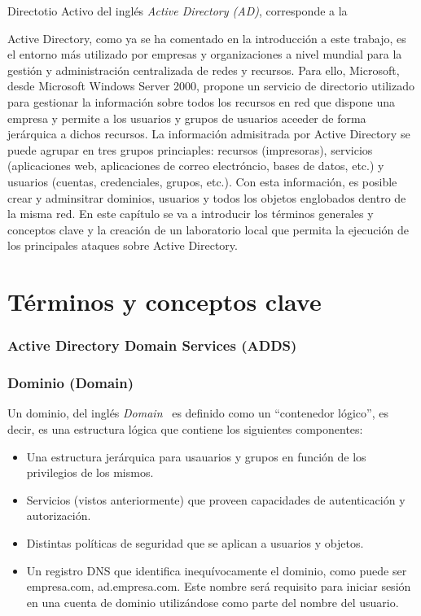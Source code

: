 Directotio Activo del inglés {\it Active Directory (AD)}, corresponde a la 

Active Directory, como ya se ha comentado en la introducción a este trabajo, es el entorno más utilizado por empresas y organizaciones a nivel mundial para la gestión y administración centralizada de redes y recursos. Para ello, Microsoft, desde Microsoft Windows Server 2000, propone un servicio de directorio utilizado para gestionar la in\-for\-ma\-ción sobre todos los recursos en red que dispone una empresa y permite a los usuarios y grupos de usuarios aceeder de forma jerárquica a dichos recursos. La in\-for\-ma\-ción admisitrada por Active Directory se puede agrupar en tres grupos princiaples: recursos (impresoras), servicios (aplicaciones web, aplicaciones de correo electróncio, bases de datos, etc.) y usuarios (cuentas, credenciales, grupos, etc.). Con esta in\-for\-ma\-ción, es posible crear y adminsitrar dominios, usuarios y todos los objetos englobados dentro de la misma red. En este capítulo se va a introducir los términos generales y conceptos clave y la creación de un laboratorio local que permita la ejecución de los principales ataques sobre Active Directory.






\section{Términos y conceptos clave}


\subsubsection{Active Directory Domain Services (ADDS)}
\subsubsection{Dominio (Domain)}

Un dominio, del inglés {\it Domain}~\cite{Capitulo4:Domain} es definido como un ``contenedor lógico'', es decir, es una estructura lógica que contiene los siguientes componentes:

\begin{itemize}
\item Una estructura jerárquica para usauarios y grupos en función de los privilegios de los mismos.
\item Servicios (vistos anteriormente) que proveen capacidades de autenticación y autorización.
\item Distintas políticas de seguridad que se aplican a usuarios y objetos.
\item Un registro DNS que identifica inequívocamente el dominio, como puede ser empresa.com, ad.empresa.com. Este nombre será requisito para iniciar sesión en una cuenta de dominio utilizándose como parte del nombre del usuario. 
\end{itemize}

